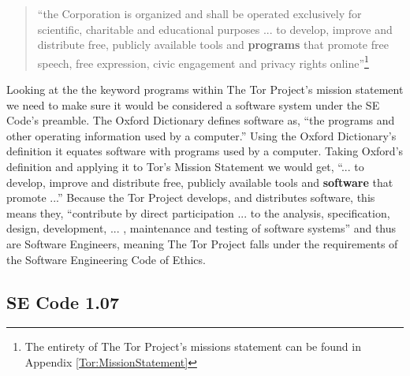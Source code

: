\documentclass[11pt]{article}
\begin{document}
\begin{multicols}{2}
\begin{quotation}
  ``the Corporation is organized and shall be operated exclusively for scientific,
  charitable and educational purposes ... to develop, improve and distribute
  free, publicly available tools and \textbf{programs} that promote free speech, free
expression, civic engagement and privacy rights online''\footnote{ The entirety
of The Tor Project's missions statement can be found in Appendix
\ref{Tor:MissionStatement}} \cite{TOR:Sponsorship} 
\end{quotation}

Looking at the the keyword programs within The Tor Project's mission statement
we need to make sure it would be considered a software system under the SE
Code's preamble. The Oxford Dictionary defines software as, ``the programs and other operating
information used by a computer.''\cite{defn:Software} Using the Oxford
Dictionary's definition it equates software with programs used by a computer.
Taking Oxford's definition and applying it to Tor's Mission Statement we would
get, ``... to develop, improve and distribute free, publicly available tools and
\textbf{software} that promote ...''
Because the Tor Project develops, and distributes software, this means they, ``contribute by
direct participation ...  to the analysis, specification, design, development,
... , maintenance and testing of software systems'' and thus are Software
Engineers, meaning The Tor Project falls under the requirements of the Software
Engineering Code of Ethics.\cite{Tor:FAQ, Tor:Overview} 


\subsection{SE Code 1.07} 


\end{multicols}
\end{document}
